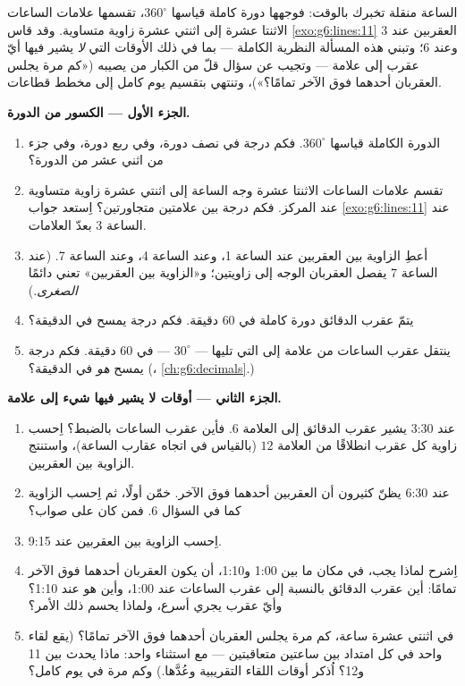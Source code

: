 \begin{problem}
\label{pb:g6:lines:1}
الساعة منقلة تخبرك بالوقت: فوجهها دورة كاملة
قياسها $360^\circ$، تقسمها علامات الساعات الاثنتا عشرة إلى اثنتي عشرة
زاوية متساوية. وقد قاس \cref{exo:g6:lines:11} العقربين
عند 3 وعند 6؛ وتبني هذه المسألة النظرية الكاملة
--- بما في ذلك الأوقات التي \emph{لا} يشير فيها أيّ عقرب إلى علامة
--- وتجيب عن سؤال قلّ من الكبار من يصيبه («كم مرة يجلس
العقربان أحدهما فوق الآخر تمامًا؟»)، وتنتهي بتقسيم
يوم كامل إلى مخطط قطاعات.

\medskip
\noindent\textbf{الجزء الأول --- الكسور من الدورة.}
\begin{enumerate}
  \item الدورة الكاملة قياسها $360^\circ$. فكم درجة في
        نصف دورة، وفي ربع دورة، وفي جزء من اثني عشر من الدورة؟
  \item تقسم علامات الساعات الاثنتا عشرة وجه الساعة إلى اثنتي عشرة
        زاوية متساوية عند المركز. فكم درجة بين علامتين
        متجاورتين؟ اِستعد جواب
        \cref{exo:g6:lines:11} عند الساعة 3 بعدّ العلامات.
  \item أعطِ الزاوية بين العقربين عند الساعة 1، وعند
        الساعة 4، وعند الساعة 7. (عند الساعة 7 يفصل العقربان
        الوجه إلى زاويتين؛ و«الزاوية بين العقربين» تعني دائمًا
        \emph{الصغرى}.)
  \item يتمّ عقرب الدقائق دورة كاملة في $60$ دقيقة. فكم
        درجة يمسح في الدقيقة؟
  \item ينتقل عقرب الساعات من علامة إلى التي تليها ---
        $30^\circ$ --- في $60$ دقيقة. فكم درجة يمسح
        \emph{هو} في الدقيقة؟ (،
        \cref{ch:g6:decimals}.)
\end{enumerate}

\medskip
\noindent\textbf{الجزء الثاني --- أوقات لا يشير فيها شيء إلى
علامة.}
\begin{enumerate}[resume]
  \item عند 3:30 يشير عقرب الدقائق إلى العلامة $6$. فأين
        عقرب الساعات بالضبط؟ اِحسب زاوية كل عقرب انطلاقًا من
        العلامة $12$ (بالقياس في اتجاه عقارب الساعة)، واستنتج
        الزاوية بين العقربين.
  \item عند 6:30 يظنّ كثيرون أن العقربين أحدهما فوق
        الآخر. خمّن أولًا، ثم اِحسب الزاوية كما في السؤال
        6. فمن كان على صواب؟
  \item اِحسب الزاوية بين العقربين عند 9:15.
  \item اِشرح لماذا يجب، في مكان ما بين 1:00 و1:10، أن يكون
        العقربان أحدهما فوق الآخر تمامًا: أين
        عقرب الدقائق بالنسبة إلى عقرب الساعات عند 1:00، وأين
        هو عند 1:10؟ وأيّ عقرب يجري أسرع، ولماذا يحسم ذلك
        الأمر؟
  \item في اثنتي عشرة ساعة، كم مرة يجلس العقربان
        أحدهما فوق الآخر تمامًا؟ (يقع لقاء واحد في
        كل امتداد بين ساعتين متعاقبتين --- مع استثناء
        واحد: ماذا يحدث بين 11 و12؟ اُذكر أوقات اللقاء
        التقريبية وعُدَّها.) وكم مرة في
        يوم كامل؟
\end{enumerate}


\end{problem}
